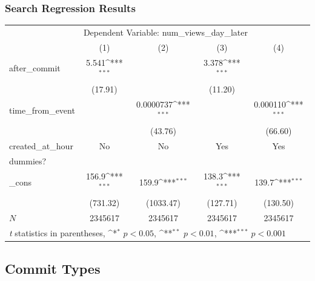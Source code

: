 \documentclass[xcolor=pdftex,dvipsnames,table]{beamer}
\begin{document}
\frame
{
    \frametitle{Search Regression Results}
    \begin{table}
    \scriptsize
    \centering
    {
        \def\sym#1{\ifmmode^{#1}\else\(^{#1}\)\fi}
        \begin{tabular}{l*{4}{c}}
        \hline\hline
            & \multicolumn{4}{l}{Dependent Variable: num\_views\_day\_later} \\
            &\multicolumn{1}{c}{(1)}&\multicolumn{1}{c}{(2)}&\multicolumn{1}{c}{(3)}&\multicolumn{1}{c}{(4)}\\
            \hline
            after\_commit&       5.541\sym{***}&               &       3.378\sym{***}&                     \\
            &     (17.91)         &                     &     (11.20)         &                     \\
            [1em]
            time\_from\_event&                     &   0.0000737\sym{***}&                     &    0.000110\sym{***}\\
            &                    &     (43.76)         &                     &     (66.60)         \\
            [1em]
            created\_at\_hour&             No        &           No           &       Yes &      Yes \\
            dummies?&                     &                     &              &            \\
            [1em]
            \_cons      &       156.9\sym{***}&       159.9\sym{***}&       138.3\sym{***}&       139.7\sym{***}\\
            &    (731.32)     &   (1033.47)         &    (127.71)         &    (130.50)         \\
            \hline
            \(N\)       &     2345617       &     2345617         &     2345617         &     2345617         \\
            \hline\hline
            \multicolumn{5}{l}{\scriptsize \textit{t} statistics in parentheses, \sym{*} \(p<0.05\), \sym{**} \(p<0.01\), \sym{***} \(p<0.001\)}\\
            \end{tabular}
    }
    \end{table}
}

\subsection{Commit Types}

\frame{\tableofcontents[currentsubsection]}
\end{document}
